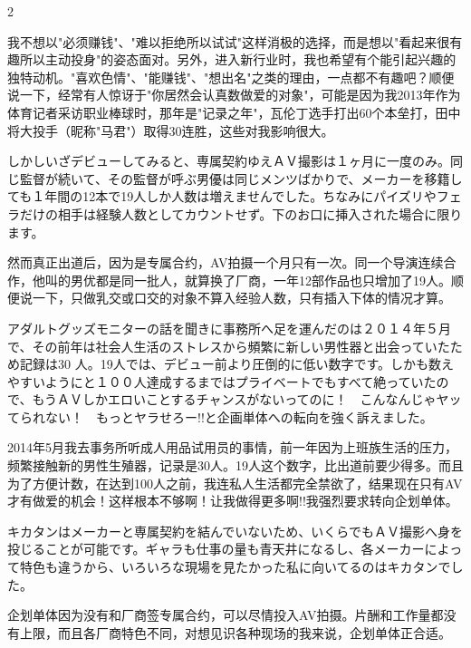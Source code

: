 \documentclass[12pt,UTF8]{ctexbook}
\begin{document}
\begin{paracol}{2}
\switchcolumn

我不想以"必须赚钱"、"难以拒绝所以试试"这样消极的选择，而是想以"看起来很有趣所以主动投身"的姿态面对。另外，进入新行业时，我也希望有个能引起兴趣的独特动机。"喜欢色情"、"能赚钱"、"想出名"之类的理由，一点都不有趣吧？顺便说一下，经常有人惊讶于"你居然会认真数做爱的对象"，可能是因为我2013年作为体育记者采访职业棒球时，那年是"记录之年"，瓦伦丁选手打出60个本垒打，田中将大投手（昵称"马君"）取得30连胜，这些对我影响很大。

\switchcolumn*

しかしいざデビューしてみると、専属契約ゆえＡＶ撮影は１ヶ月に一度のみ。同じ監督が続いて、その監督が呼ぶ男優は同じメンツばかりで、メーカーを移籍しても１年間の12本で19人しか人数は増えませんでした。ちなみにパイズリやフェラだけの相手は経験人数としてカウントせず。下のお口に挿入された場合に限ります。

\switchcolumn

然而真正出道后，因为是专属合约，AV拍摄一个月只有一次。同一个导演连续合作，他叫的男优都是同一批人，就算换了厂商，一年12部作品也只增加了19人。顺便说一下，只做乳交或口交的对象不算入经验人数，只有插入下体的情况才算。

\switchcolumn*

アダルトグッズモニターの話を聞きに事務所へ足を運んだのは２０１４年５月で、その前年は社会人生活のストレスから頻繁に新しい男性器と出会っていたため記録は30
人。19人では、デビュー前より圧倒的に低い数字です。しかも数えやすいようにと１００人達成するまではプライベートでもすべて絶っていたので、もうＡＶしかエロいことするチャンスがないってのに！　こんなんじゃヤッてられない！　もっとヤラせろー!!と企画単体への転向を強く訴えました。

\switchcolumn

2014年5月我去事务所听成人用品试用员的事情，前一年因为上班族生活的压力，频繁接触新的男性生殖器，记录是30人。19人这个数字，比出道前要少得多。而且为了方便计数，在达到100人之前，我连私人生活都完全禁欲了，结果现在只有AV才有做爱的机会！这样根本不够啊！让我做得更多啊!!我强烈要求转向企划单体。

\switchcolumn*

キカタンはメーカーと専属契約を結んでいないため、いくらでもＡＶ撮影へ身を投じることが可能です。ギャラも仕事の量も青天井になるし、各メーカーによって特色も違うから、いろいろな現場を見たかった私に向いてるのはキカタンでした。

\switchcolumn

企划单体因为没有和厂商签专属合约，可以尽情投入AV拍摄。片酬和工作量都没有上限，而且各厂商特色不同，对想见识各种现场的我来说，企划单体正合适。


\end{paracol}
\end{document}
